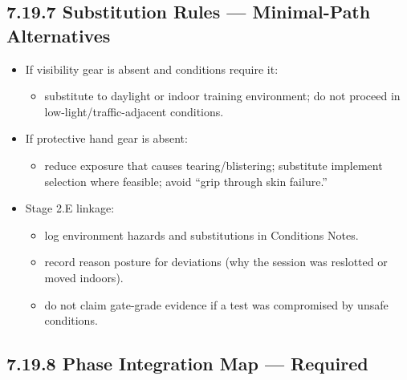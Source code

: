 \documentclass[10pt]{article}
\begin{document}
\subsection*{7.19.7 Substitution Rules — Minimal-Path Alternatives}
{}

\begin{itemize}
\item If visibility gear is absent and conditions require it:
  \begin{itemize}
  \item substitute to daylight or indoor training environment; do not proceed in low-light/traffic-adjacent conditions.
  \end{itemize}
\item If protective hand gear is absent:
  \begin{itemize}
  \item reduce exposure that causes tearing/blistering; substitute implement selection where feasible; avoid “grip through skin failure.”
  \end{itemize}
\item Stage 2.E linkage:
  \begin{itemize}
  \item log environment hazards and substitutions in Conditions Notes.
  \item record reason posture for deviations (why the session was reslotted or moved indoors).
  \item do not claim gate-grade evidence if a test was compromised by unsafe conditions.
  \end{itemize}
\end{itemize}

\subsection*{7.19.8 Phase Integration Map — Required}
{}

\begingroup
\scriptsize
\setlength{\tabcolsep}{2pt}
\renewcommand{\arraystretch}{1.12}
\end{document}
